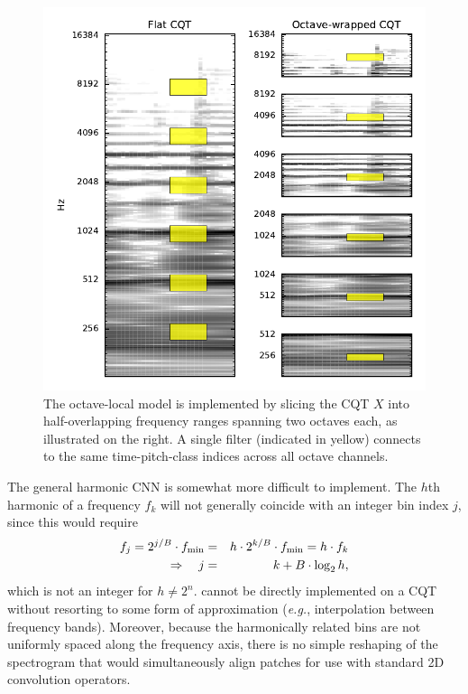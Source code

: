 \documentclass{article}
\def\eg{\emph{e.g.}}
\begin{document}
\begin{figure}
    \includegraphics[width=\columnwidth]{figs/octave-local}
    \caption{The octave-local model is implemented by slicing the CQT $X$ into half-overlapping frequency ranges spanning two octaves each, as illustrated on the right.
    A single filter (indicated in yellow) connects to the same time-pitch-class indices across all octave channels.}
\label{fig:ocnn}
\end{figure}


The general harmonic CNN is somewhat more difficult to implement.
The $h$th harmonic of a frequency $f_k$ will not generally coincide with an integer bin index $j$, since this would require
\begin{eqnarray}
    f_j = 2^{j/B} \cdot f_{\min} &=& h \cdot 2^{k/B}\cdot f_{\min} = h \cdot f_k \notag \\
\Rightarrow \quad j &=& k + B \cdot \log_2 h,
\end{eqnarray}
which is not an integer for $h \neq 2^n$.
 cannot be directly implemented on a CQT without resorting to some form of approximation (\eg, interpolation between frequency bands).
Moreover, because the harmonically related bins are not uniformly spaced along the frequency axis, there is no simple reshaping of the spectrogram that would simultaneously align patches for use with standard 2D convolution operators.
\end{document}
